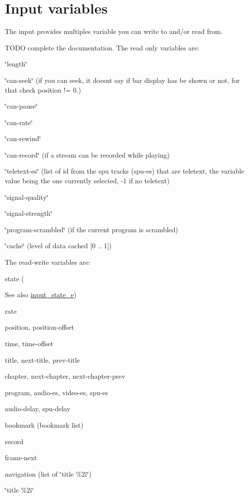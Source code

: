 \hypertarget{group__inputvariable}{}\section{Input variables}
\label{group__inputvariable}
The input provides multiples variable you can write to and/or read from.

T\+O\+DO complete the documentation. The read only variables are\+:
\begin{DoxyItemize}
\item \char`\"{}length\char`\"{}
\item \char`\"{}can-\/seek\char`\"{} (if you can seek, it doesn\textquotesingle{}t say if \textquotesingle{}bar display\textquotesingle{} has be shown or not, for that check position != 0.)
\item \char`\"{}can-\/pause\char`\"{}
\item \char`\"{}can-\/rate\char`\"{}
\item \char`\"{}can-\/rewind\char`\"{}
\item \char`\"{}can-\/record\char`\"{} (if a stream can be recorded while playing)
\item \char`\"{}teletext-\/es\char`\"{} (list of id from the spu tracks (spu-\/es) that are teletext, the variable value being the one currently selected, -\/1 if no teletext)
\item \char`\"{}signal-\/quality\char`\"{}
\item \char`\"{}signal-\/strength\char`\"{}
\item \char`\"{}program-\/scrambled\char`\"{} (if the current program is scrambled)
\item \char`\"{}cache\char`\"{} (level of data cached \mbox{[}0 .. 1\mbox{]})
\end{DoxyItemize}

The read-\/write variables are\+:
\begin{DoxyItemize}
\item state (\begin{DoxySeeAlso}{See also}
\hyperlink{vlc__input_8h_a50f8cb1c3cdf6bfc02752c1d41b723b4}{input\+\_\+state\+\_\+e})
\end{DoxySeeAlso}

\item rate
\item position, position-\/offset
\item time, time-\/offset
\item title, next-\/title, prev-\/title
\item chapter, next-\/chapter, next-\/chapter-\/prev
\item program, audio-\/es, video-\/es, spu-\/es
\item audio-\/delay, spu-\/delay
\item bookmark (bookmark list)
\item record
\item frame-\/next
\item navigation (list of \char`\"{}title \%2i\char`\"{})
\item \char`\"{}title \%2i\char`\"{}
\end{DoxyItemize}


